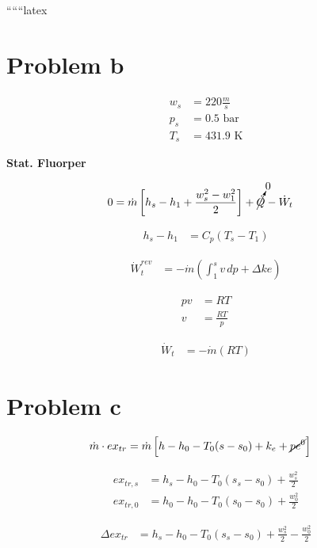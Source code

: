 ``````latex


\section*{Problem b}

\begin{align*}
w_s &= 220 \frac{m}{s} \\
p_s &= 0.5 \text{ bar} \\
T_s &= 431.9 \text{ K}
\end{align*}

\textbf{Stat. Fluorper}

\begin{align*}
0 &= \dot{m} \left[ h_s - h_1 + \frac{w_s^2 - w_1^2}{2} \right] + \cancelto{0}{\dot{Q}} - \dot{W}_t
\end{align*}

\begin{align*}
h_s - h_1 &= C_p (T_s - T_1)
\end{align*}

\begin{align*}
\dot{W}_t^{rev} &= - \dot{m} \left( \int_{1}^{s} v \, dp + \Delta ke \right)
\end{align*}

\begin{align*}
pv &= RT \\
v &= \frac{RT}{p}
\end{align*}

\begin{align*}
\dot{W}_t &= - \dot{m} \left( RT \right)
\end{align*}

\section*{Problem c}

\begin{align*}
\dot{m} \cdot ex_{tr} &= \dot{m} \left[ h - h_0 - T_0 (s - s_0) + k_e + \cancel{pe^0} \right]
\end{align*}

\begin{align*}
ex_{tr,s} &= h_s - h_0 - T_0 (s_s - s_0) + \frac{w_s^2}{2} \\
ex_{tr,0} &= h_0 - h_0 - T_0 (s_0 - s_0) + \frac{w_0^2}{2}
\end{align*}

\begin{align*}
\Delta ex_{tr} &= h_s - h_0 - T_0 (s_s - s_0) + \frac{w_s^2}{2} - \frac{w_0^2}{2}
\end{align*}


